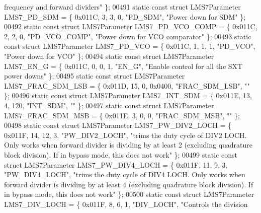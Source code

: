 \begin{DoxyCode}
{       frequency and forward dividers"} \};
00491 \textcolor{keyword}{static} \textcolor{keyword}{const} \textcolor{keyword}{struct }LMS7Parameter LMS7_PD_SDM = \{ 0x011C, 3, 3, 0, \textcolor{stringliteral}{"PD\_SDM"}, \textcolor{stringliteral}{"Power down for SDM"} \};
00492 \textcolor{keyword}{static} \textcolor{keyword}{const} \textcolor{keyword}{struct }LMS7Parameter LMS7_PD_VCO_COMP = \{ 0x011C, 2, 2, 0, \textcolor{stringliteral}{"PD\_VCO\_COMP"}, \textcolor{stringliteral}{"Power down for VCO
       comparator"} \};
00493 \textcolor{keyword}{static} \textcolor{keyword}{const} \textcolor{keyword}{struct }LMS7Parameter LMS7_PD_VCO = \{ 0x011C, 1, 1, 1, \textcolor{stringliteral}{"PD\_VCO"}, \textcolor{stringliteral}{"Power down for VCO"} \};
00494 \textcolor{keyword}{static} \textcolor{keyword}{const} \textcolor{keyword}{struct }LMS7Parameter LMS7_EN_G = \{ 0x011C, 0, 0, 1, \textcolor{stringliteral}{"EN\_G"}, \textcolor{stringliteral}{"Enable control for all the SXT
       power downs"} \};
00495 \textcolor{keyword}{static} \textcolor{keyword}{const} \textcolor{keyword}{struct }LMS7Parameter LMS7_FRAC_SDM_LSB = \{ 0x011D, 15, 0, 0x0400, \textcolor{stringliteral}{"FRAC\_SDM\_LSB"}, \textcolor{stringliteral}{""} \};
00496 \textcolor{keyword}{static} \textcolor{keyword}{const} \textcolor{keyword}{struct }LMS7Parameter LMS7_INT_SDM = \{ 0x011E, 13, 4, 120, \textcolor{stringliteral}{"INT\_SDM"}, \textcolor{stringliteral}{""} \};
00497 \textcolor{keyword}{static} \textcolor{keyword}{const} \textcolor{keyword}{struct }LMS7Parameter LMS7_FRAC_SDM_MSB = \{ 0x011E, 3, 0, 0, \textcolor{stringliteral}{"FRAC\_SDM\_MSB"}, \textcolor{stringliteral}{""} \};
00498 \textcolor{keyword}{static} \textcolor{keyword}{const} \textcolor{keyword}{struct }LMS7Parameter LMS7_PW_DIV2_LOCH = \{ 0x011F, 14, 12, 3, \textcolor{stringliteral}{"PW\_DIV2\_LOCH"}, \textcolor{stringliteral}{"trims the duty
       cycle of DIV2 LOCH. Only works when forward divider is dividing by at least 2 (excluding quadrature block
       division). If in bypass mode, this does not work"} \};
00499 \textcolor{keyword}{static} \textcolor{keyword}{const} \textcolor{keyword}{struct }LMS7Parameter LMS7_PW_DIV4_LOCH = \{ 0x011F, 11, 9, 3, \textcolor{stringliteral}{"PW\_DIV4\_LOCH"}, \textcolor{stringliteral}{"trims the duty
       cycle of DIV4 LOCH. Only works when forward divider is dividing by at least 4 (excluding quadrature block
       division). If in bypass mode, this does not work"} \};
00500 \textcolor{keyword}{static} \textcolor{keyword}{const} \textcolor{keyword}{struct }LMS7Parameter LMS7_DIV_LOCH = \{ 0x011F, 8, 6, 1, \textcolor{stringliteral}{"DIV\_LOCH"}, \textcolor{stringliteral}{"Controls the division
}
\end{DoxyCode}
